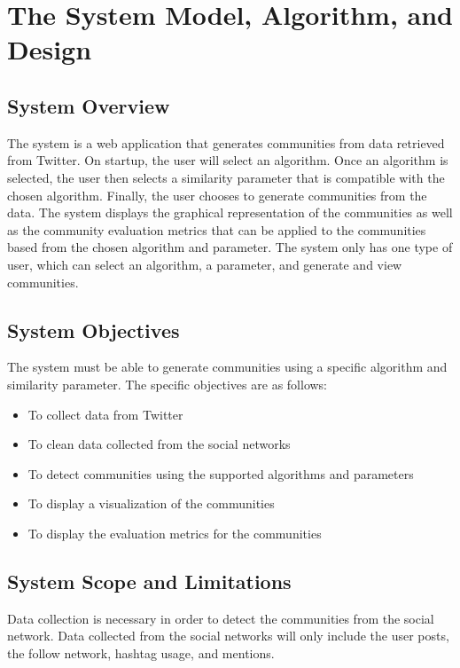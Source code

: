 %
%
%                 


\chapter{The System Model, Algorithm, and Design}
\label{sec:sysmodel}


\section{System Overview}
The system is a web application that generates communities from data retrieved from Twitter. 
On startup, the user will select an algorithm. Once an algorithm is selected, the user then selects a similarity parameter that is compatible
with the chosen algorithm. Finally, the user chooses to generate communities from the data. The system displays 
the graphical representation of the communities as well as the community evaluation metrics that can be applied 
to the communities based from the chosen algorithm and parameter. The system only has one type of user, which 
can select an algorithm, a parameter, and generate and view communities.


\section{System Objectives}
The system must be able to generate communities using a specific algorithm and similarity parameter. The specific objectives are as follows:


\begin{itemize}
	\item To collect data from Twitter
	\item To clean data collected from the social networks
	\item To detect communities using the supported algorithms and parameters
	\item To display a visualization of the communities
	\item To display the evaluation metrics for the communities
\end{itemize}


\section{System Scope and Limitations}
Data collection is necessary in order to detect the communities from the social network.
Data collected from the social networks will only include the user posts, the follow network,
hashtag usage, and mentions.


